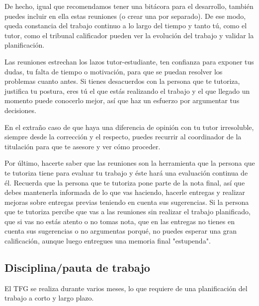 De hecho, igual que recomendamos tener una bitácora para el desarrollo, también puedes incluir en ella estas reuniones (o crear una por separado). De ese modo, queda constancia del trabajo continuo a lo largo del tiempo y tanto tú, como el tutor, como el tribunal calificador pueden ver la evolución del trabajo y validar la planificación.

Las reuniones estrechan los lazos tutor-estudiante, ten confianza para exponer tus dudas, tu falta de tiempo o motivación, para que se puedan resolver los problemas cuanto antes. Si tienes desacuerdos con la persona que te tutoriza, justifica tu postura, eres tú el que estás realizando el trabajo y el que llegado un momento puede conocerlo mejor, así que haz un esfuerzo por argumentar tus decisiones. 

En el extraño caso de que haya una diferencia de opinión con tu tutor irresoluble, siempre desde la corrección y el respecto, puedes recurrir al coordinador de la titulación para que te asesore y ver cómo proceder. 


Por último, hacerte saber que las reuniones son la herramienta que la persona que te tutoriza tiene para evaluar tu trabajo y éste hará una evaluación continua de él. Recuerda que la persona que te tutoriza pone parte de la nota final, así que debes mantenerla informada de lo que vas haciendo, hacerle entregas y realizar mejoras sobre entregas previas teniendo en cuenta sus sugerencias. Si la persona que te tutoriza percibe que vas a las reuniones sin realizar el trabajo planificado, que si vas no estás atento o no tomas nota, que en las entregas no tienes en cuenta sus sugerencias o no argumentas porqué, no puedes esperar una gran calificación, aunque luego entregues una memoria final "estupenda".

\subsection{Disciplina/pauta de trabajo}%

El TFG se realiza durante varios meses, lo que requiere de una planificación del trabajo a corto y largo plazo. 

